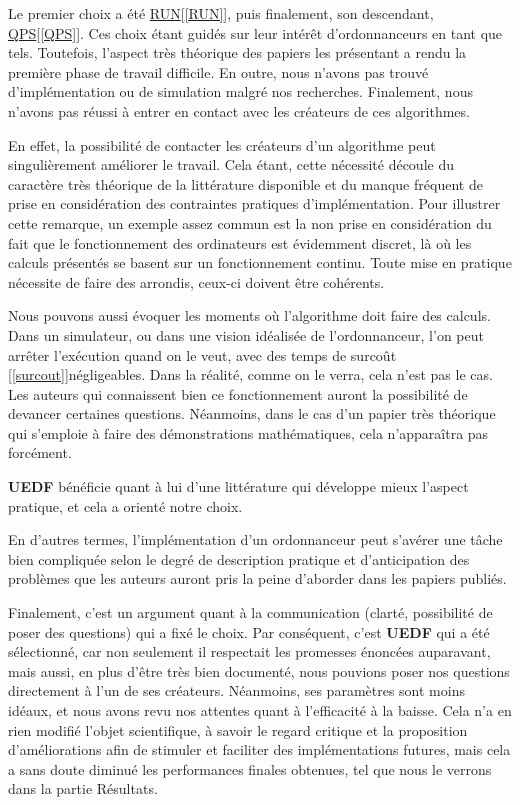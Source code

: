 	Le premier choix a été \hyperref[RUN]{RUN}[\ref*{RUN}], puis finalement, son descendant, \hyperref[QPS]{QPS}[\ref*{QPS}]. Ces choix étant guidés 
	sur leur intérêt d'ordonnanceurs en tant que tels.
	Toutefois, l'aspect très théorique des papiers les présentant a rendu la première phase de travail difficile. 
	En outre, nous n'avons pas trouvé d'implémentation ou de simulation malgré nos recherches.
	Finalement, nous n'avons pas réussi à entrer en contact avec les créateurs de ces algorithmes. \newline
	
	En effet, la possibilité de contacter les créateurs d'un algorithme peut singulièrement améliorer le 
	travail. Cela étant, cette nécessité découle du caractère très théorique de la littérature disponible
	et du manque fréquent de prise en considération des contraintes pratiques d'implémentation. 
	Pour illustrer cette remarque, un exemple assez commun est la non prise en considération 
	du fait que le fonctionnement des ordinateurs est évidemment discret, là où les 
	calculs présentés se basent sur un fonctionnement continu.
	Toute mise en pratique nécessite de faire des arrondis, ceux-ci doivent être cohérents.\newline
	
	Nous pouvons aussi évoquer les moments où l'algorithme doit faire des calculs. 
	Dans un simulateur, ou dans une vision idéalisée de l'ordonnanceur, l'on peut arrêter l'exécution 
	quand on le veut, avec des temps de surcoût [\ref*{surcout}]négligeables. Dans la réalité, comme on le verra, cela 
	n'est pas le cas. 
	Les auteurs qui connaissent bien ce fonctionnement auront la possibilité de devancer certaines questions.
	Néanmoins, dans le cas d'un papier très théorique qui s'emploie à faire des démonstrations mathématiques, 
	cela n'apparaîtra pas forcément. \newline
	
	\textbf{UEDF} bénéficie quant à lui d'une littérature qui développe mieux l'aspect pratique, et cela a orienté notre choix.\newline
	
	En d'autres termes, l'implémentation d'un ordonnanceur peut s'avérer une tâche bien compliquée selon le degré de 
	description pratique et d'anticipation des problèmes que les auteurs auront pris la peine d'aborder 
	dans les papiers publiés.
	\newline
	
	
	Finalement, c'est un argument quant à la communication (clarté, possibilité de poser des questions) 
	qui a fixé le choix. Par conséquent, c'est \textbf{UEDF} qui a été sélectionné, car 
	non seulement il respectait 
	les promesses énoncées auparavant, mais aussi, en plus d'être très bien documenté, 
	nous pouvions poser nos questions directement à l'un de ses créateurs. Néanmoins, ses paramètres sont moins idéaux, 
	et nous avons revu nos attentes quant à l'efficacité à la baisse. Cela n'a en rien 
	modifié l'objet scientifique, à savoir le regard critique et la proposition d'améliorations 
	afin de stimuler et faciliter des implémentations futures, mais cela a sans doute 
	diminué les performances finales obtenues, tel que nous le verrons dans la partie Résultats.\newline
	

